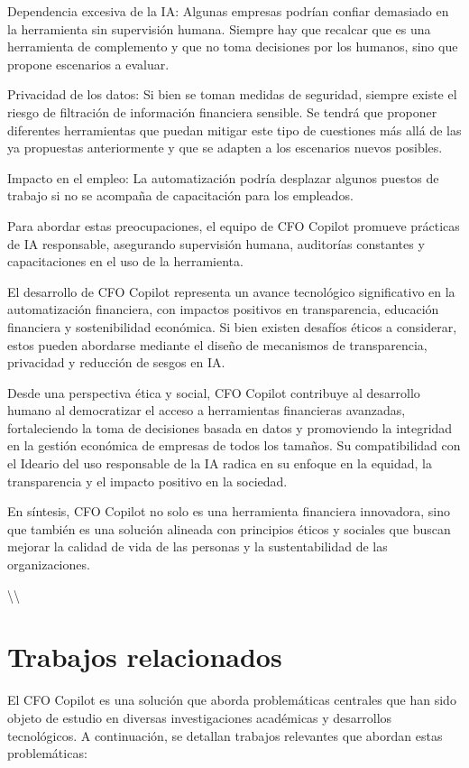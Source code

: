 \documentclass[12pt,letterpaper,oneside]{report}
\renewcommand{\_}{\UnderscoreOriginal\allowbreak}
\begin{document}
Dependencia excesiva de la IA: Algunas empresas podrían confiar demasiado en la herramienta sin supervisión humana. Siempre hay que recalcar que es una herramienta de complemento y que no toma decisiones por los humanos, sino que propone escenarios a evaluar.

Privacidad de los datos: Si bien se toman medidas de seguridad, siempre existe el riesgo de filtración de información financiera sensible. Se tendrá que proponer diferentes herramientas que puedan mitigar este tipo de cuestiones más allá de las ya propuestas anteriormente y que se adapten a los escenarios nuevos posibles.

Impacto en el empleo: La automatización podría desplazar algunos puestos de trabajo si no se acompaña de capacitación para los empleados.

Para abordar estas preocupaciones, el equipo de CFO Copilot promueve prácticas de IA responsable, asegurando supervisión humana, auditorías constantes y capacitaciones en el uso de la herramienta.

El desarrollo de CFO Copilot representa un avance tecnológico significativo en la automatización financiera, con impactos positivos en transparencia, educación financiera y sostenibilidad económica. Si bien existen desafíos éticos a considerar, estos pueden abordarse mediante el diseño de mecanismos de transparencia, privacidad y reducción de sesgos en IA.

Desde una perspectiva ética y social, CFO Copilot contribuye al desarrollo humano al democratizar el acceso a herramientas financieras avanzadas, fortaleciendo la toma de decisiones basada en datos y promoviendo la integridad en la gestión económica de empresas de todos los tamaños. Su compatibilidad con el Ideario del uso responsable de la IA radica en su enfoque en la equidad, la transparencia y el impacto positivo en la sociedad.

En síntesis, CFO Copilot no solo es una herramienta financiera innovadora, sino que también es una solución alineada con principios éticos y sociales que buscan mejorar la calidad de vida de las personas y la sustentabilidad de las organizaciones.

\textbackslash{}\textbackslash{}

\chapter{Trabajos relacionados}
El CFO Copilot es una solución que aborda problemáticas centrales que han sido objeto de estudio en diversas investigaciones académicas y desarrollos tecnológicos. A continuación, se detallan trabajos relevantes que abordan estas problemáticas:
\end{document}
